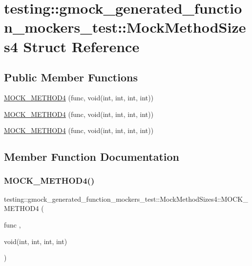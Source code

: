 \hypertarget{structtesting_1_1gmock__generated__function__mockers__test_1_1_mock_method_sizes4}{}\section{testing\+::gmock\+\_\+generated\+\_\+function\+\_\+mockers\+\_\+test\+::Mock\+Method\+Sizes4 Struct Reference}
\label{structtesting_1_1gmock__generated__function__mockers__test_1_1_mock_method_sizes4}
\subsection*{Public Member Functions}
\begin{DoxyCompactItemize}
\item 
\mbox{\hyperlink{structtesting_1_1gmock__generated__function__mockers__test_1_1_mock_method_sizes4_a140f1bc5124d32b763913f5f64fe3502}{M\+O\+C\+K\+\_\+\+M\+E\+T\+H\+O\+D4}} (func, void(int, int, int, int))
\item 
\mbox{\hyperlink{structtesting_1_1gmock__generated__function__mockers__test_1_1_mock_method_sizes4_a140f1bc5124d32b763913f5f64fe3502}{M\+O\+C\+K\+\_\+\+M\+E\+T\+H\+O\+D4}} (func, void(int, int, int, int))
\item 
\mbox{\hyperlink{structtesting_1_1gmock__generated__function__mockers__test_1_1_mock_method_sizes4_a140f1bc5124d32b763913f5f64fe3502}{M\+O\+C\+K\+\_\+\+M\+E\+T\+H\+O\+D4}} (func, void(int, int, int, int))
\end{DoxyCompactItemize}


\subsection{Member Function Documentation}
\mbox{\label{structtesting_1_1gmock__generated__function__mockers__test_1_1_mock_method_sizes4_a140f1bc5124d32b763913f5f64fe3502}} 
\subsubsection{\texorpdfstring{MOCK\_METHOD4()}{MOCK\_METHOD4()}\hspace{0.1cm}{\footnotesize\ttfamily [1/3]}}
{\footnotesize\ttfamily testing\+::gmock\+\_\+generated\+\_\+function\+\_\+mockers\+\_\+test\+::\+Mock\+Method\+Sizes4\+::\+M\+O\+C\+K\+\_\+\+M\+E\+T\+H\+O\+D4 (\begin{DoxyParamCaption}\item[{func}]{,  }\item[{void(int, int, int, int)}]{ }\end{DoxyParamCaption})}

